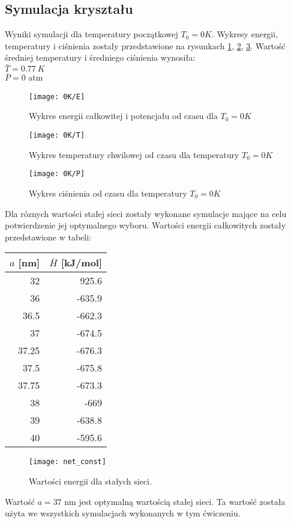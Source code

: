 \documentclass[a4paper,10pt]{article}
\begin{document}
	\subsection{Symulacja kryształu}
		Wyniki symulacji dla temperatury początkowej $T_0=0 K$. Wykresy energii, temperatury i ciśnienia zostały przedstawione na rysunkach \ref{0ke}, \ref{0kt}, \ref{0kp}. Wartość średniej temperatury i średniego ciśnienia wynosiła: \\
		$\bar{T} = 0.77~K$\\
		$\bar{P} = 0$ atm
	    \begin{figure}[h]
		    \centering
		    \texttt{[image: 0K/E]}
		    \caption{Wykres energii całkowitej i potencjału od czasu dla $T_0 = 0 K$}
		    \label{0ke}
	    \end{figure}
	    \begin{figure}[h]
		    \centering
		    \texttt{[image: 0K/T]}
		    \caption{Wykres temperatury chwilowej od czasu dla temperatury $T_0 = 0 K$}
		    \label{0kt}
	    \end{figure}
	    \begin{figure}[h]
		    \centering
		    \texttt{[image: 0K/P]}
		    \caption{Wykres ciśnienia od czasu dla temperatury $T_0 = 0 K$}
		    \label{0kp}
	    \end{figure}
	\clearpage
	Dla róznych wartości stałej sieci zostały wykonane symulacje mające na celu potwierdzenie jej optymalnego wyboru. Wartości energii całkowitych zostały przedstawione w tabeli:
	\begin{center}
		\begin{tabular}{r|r}
			$a$ [nm] & $\bar{H}$ [kJ/mol]\\
			\hline
			\hline
			32 & 925.6\\
			36 & -635.9 \\
			36.5 & -662.3\\
			37 & -674.5\\
			37.25 & -676.3\\
			37.5 & -675.8\\
			37.75 & -673.3 \\
			38 & -669\\
		 	39 & -638.8 \\
		 	40 & -595.6
		\end{tabular}
	\end{center}
	\begin{figure}[h]
	    \centering
	    \texttt{[image: net\_const]}
	    \caption{Wartości energii dla stałych sieci.}
	    \label{net_const}
	\end{figure}
	Wartość $a = 37$ nm jest optymalną wartością stałej sieci. Ta wartość została użyta we wszystkich symulacjach wykonanych w tym ćwiczeniu.
\end{document}

